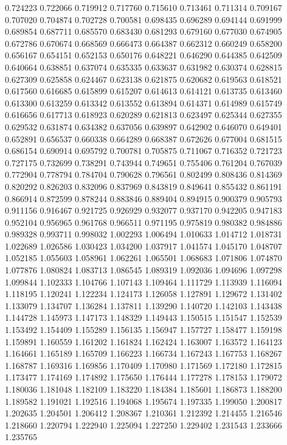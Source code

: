 0.724223
0.722066
0.719912
0.717760
0.715610
0.713461
0.711314
0.709167
0.707020
0.704874
0.702728
0.700581
0.698435
0.696289
0.694144
0.691999
0.689854
0.687711
0.685570
0.683430
0.681293
0.679160
0.677030
0.674905
0.672786
0.670674
0.668569
0.666473
0.664387
0.662312
0.660249
0.658200
0.656167
0.654151
0.652153
0.650176
0.648221
0.646290
0.644385
0.642509
0.640664
0.638851
0.637074
0.635335
0.633637
0.631982
0.630374
0.628815
0.627309
0.625858
0.624467
0.623138
0.621875
0.620682
0.619563
0.618521
0.617560
0.616685
0.615899
0.615207
0.614613
0.614121
0.613735
0.613460
0.613300
0.613259
0.613342
0.613552
0.613894
0.614371
0.614989
0.615749
0.616656
0.617713
0.618923
0.620289
0.621813
0.623497
0.625344
0.627355
0.629532
0.631874
0.634382
0.637056
0.639897
0.642902
0.646070
0.649401
0.652891
0.656537
0.660338
0.664289
0.668387
0.672626
0.677004
0.681515
0.686154
0.690914
0.695792
0.700781
0.705875
0.711067
0.716352
0.721723
0.727175
0.732699
0.738291
0.743944
0.749651
0.755406
0.761204
0.767039
0.772904
0.778794
0.784704
0.790628
0.796561
0.802499
0.808436
0.814369
0.820292
0.826203
0.832096
0.837969
0.843819
0.849641
0.855432
0.861191
0.866914
0.872599
0.878244
0.883846
0.889404
0.894915
0.900379
0.905793
0.911156
0.916467
0.921725
0.926929
0.932077
0.937170
0.942205
0.947183
0.952104
0.956965
0.961768
0.966511
0.971195
0.975819
0.980382
0.984886
0.989328
0.993711
0.998032
1.002293
1.006494
1.010633
1.014712
1.018731
1.022689
1.026586
1.030423
1.034200
1.037917
1.041574
1.045170
1.048707
1.052185
1.055603
1.058961
1.062261
1.065501
1.068683
1.071806
1.074870
1.077876
1.080824
1.083713
1.086545
1.089319
1.092036
1.094696
1.097298
1.099844
1.102333
1.104766
1.107143
1.109464
1.111729
1.113939
1.116094
1.118195
1.120241
1.122234
1.124173
1.126058
1.127891
1.129672
1.131402
1.133079
1.134707
1.136284
1.137811
1.139290
1.140720
1.142103
1.143438
1.144728
1.145973
1.147173
1.148329
1.149443
1.150515
1.151547
1.152539
1.153492
1.154409
1.155289
1.156135
1.156947
1.157727
1.158477
1.159198
1.159891
1.160559
1.161202
1.161824
1.162424
1.163007
1.163572
1.164123
1.164661
1.165189
1.165709
1.166223
1.166734
1.167243
1.167753
1.168267
1.168787
1.169316
1.169856
1.170409
1.170980
1.171569
1.172180
1.172815
1.173477
1.174169
1.174892
1.175650
1.176444
1.177278
1.178153
1.179072
1.180036
1.181048
1.182109
1.183220
1.184384
1.185601
1.186873
1.188200
1.189582
1.191021
1.192516
1.194068
1.195674
1.197335
1.199050
1.200817
1.202635
1.204501
1.206412
1.208367
1.210361
1.212392
1.214455
1.216546
1.218660
1.220794
1.222940
1.225094
1.227250
1.229402
1.231543
1.233666
1.235765
